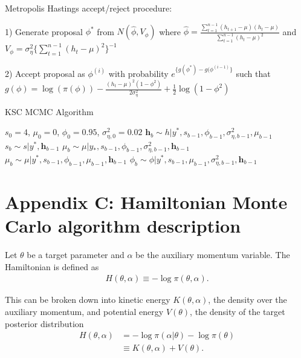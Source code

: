 \documentclass[12pt, a4paper]{article}
\begin{document}
Metropolis Hastings accept/reject procedure:

1) Generate proposal $\phi^\ast$ from $N(\hat{\phi}, V_{\phi})$ where $\hat{\phi} = \frac{\sum_{t=1}^{n-1} (h_{t+1} - \mu)(h_t - \mu)}{\sum_{t=1}^{n-1} (h_t - \mu)^2}$ and $V_{\phi} = \sigma^2_{\eta} \{\sum_{t=1}^{n-1} (h_t - \mu)^2\}^{-1}$

2) Accept proposal as $\phi^{(i)}$ with probability $e^{\{g(\phi^\ast) - g(\phi^{(i-1)}\}}$ such that $g(\phi) = \log (\pi (\phi)) - \frac {(h_t - \mu)^2 (1-\phi^2)}{2 \sigma_{\eta}^2} + \frac{1}{2} \log (1-\phi^2)$


        \begin{algorithm}[H]
            \caption{KSC MCMC Algorithm}\label{alg:ksc}
            \begin{algorithmic}
            \Require $s_0 = 4$, $\mu_0 = 0$, $\phi_0 = 0.95$, $\sigma^{2}_{\eta,0} = 0.02$
                    \State {} $\boldsymbol{h}_b \sim h|y^{\ast}, s_{b-1}, \phi_{b-1}, \sigma^{2}_{\eta,b-1}, \mu_{b-1}$ 
                    \State {} $s_b \sim s|y^{\ast}, \boldsymbol{h}_{b-1}$
                    \State {} $\mu_b \sim \mu|y_{\ast}, s_{b-1}, \phi_{b-1}, \sigma^{2}_{\eta, b-1}, \boldsymbol{h}_{b-1}$
                    \State {} $\mu_b \sim \mu|y^{\ast}, s_{b-1}, \phi_{b-1}, \mu_{b-1}, \boldsymbol{h}_{b-1}$
                    \State {} $\phi_b \sim \phi|y^{\ast}, s_{b-1}, \mu_{b-1}, \sigma^{2}_{\eta, b-1}, \boldsymbol{h}_{b-1}$
                  \EndFor
            \end{algorithmic}
            \end{algorithm}

\newpage

\section{Appendix C: Hamiltonian Monte Carlo algorithm description}
Let $\theta$ be a target parameter and $\alpha$ be the auxiliary momentum variable. The Hamiltonian is defined as
\begin{align}
H(\theta, \alpha) \equiv - \log \pi(\theta, \alpha).
\end{align}

This can be broken down into kinetic energy $K(\theta, \alpha)$, the density over the auxiliary momentum, and potential energy $V(\theta)$, the density of the target posterior distribution
\begin{align}
H(\theta, \alpha) &= - \log \pi(\alpha | \theta) - \log \pi(\theta) \\ 
&\equiv  K(\theta, \alpha) + V(\theta).
\end{align}
\end{document}
